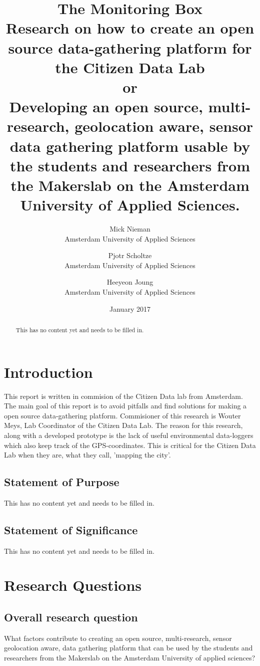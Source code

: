\documentclass{report}
\title{The Monitoring Box \\ 
Research on how to create an open source data-gathering platform for the Citizen Data Lab
\\ or  \\
Developing an open source, multi-research, geolocation aware, sensor data gathering platform usable by the students and researchers from the Makerslab on the Amsterdam University of Applied Sciences.}
\author{Mick Nieman \\ Amsterdam University of Applied Sciences \and
 Pjotr Scholtze \\ Amsterdam University of Applied Sciences \and
 Heeyeon Joung \\ Amsterdam University of Applied Sciences}
\date{January 2017}
\begin{document}
\maketitle

\begin{abstract}
This has no content yet and needs to be filled in.     
\end{abstract}

\tableofcontents

\chapter{Introduction}
This report is written in commision of the Citizen Data lab from Amsterdam. The main goal of this report is to avoid pitfalls and find solutions for making a open source data-gathering platform. Commisioner of this research is Wouter Meys, Lab Coordinator of the Citizen Data Lab. The reason for this research, along with a developed prototype is the lack of useful environmental data-loggers which also keep track of the GPS-coordinates. This is critical for the Citizen Data Lab when they are, what they call, 'mapping the city'. 

\section{Statement of Purpose}
This has no content yet and needs to be filled in. 

\section{Statement of Significance}
This has no content yet and needs to be filled in. 

\chapter{Research Questions}

\section{Overall research question}
What factors contribute to creating an open source, multi-research, sensor geolocation aware, data gathering platform that can be used by the students and researchers from the Makerslab on the Amsterdam University of applied sciences?
\end{document}
